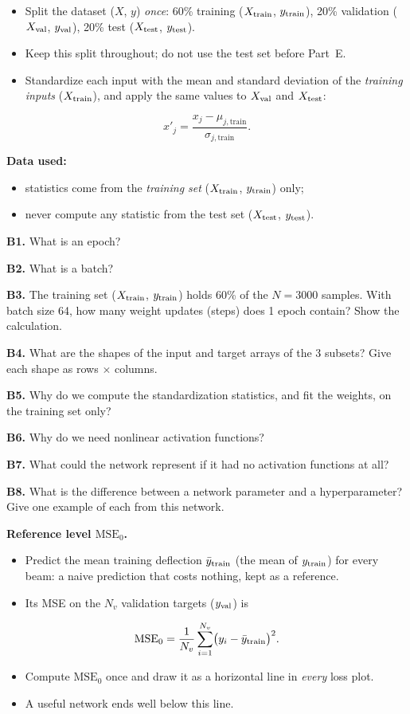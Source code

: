 \documentclass[11pt]{article}
\newcommand{\question}[2]{\par\noindent\textbf{#1.} #2\par}
\newcommand{\datause}[1]{\par\smallskip\needspace{4\baselineskip}\noindent\textbf{Data used:}\nopagebreak\begin{itemize}#1\end{itemize}}
\begin{document}
\begin{itemize}
  \item Split the dataset ($X$, $y$) \emph{once}: 60\% training ($X_{\rm train}$, $y_{\rm train}$), 20\% validation ($X_{\rm val}$, $y_{\rm val}$), 20\% test ($X_{\rm test}$, $y_{\rm test}$).
  \item Keep this split throughout; do not use the test set before Part~E.
  \item Standardize each input with the mean and standard deviation of the \emph{training inputs} ($X_{\rm train}$), and apply the same values to $X_{\rm val}$ and $X_{\rm test}$:
\end{itemize}
\[
  x'_j=\frac{x_j-\mu_{j,\mathrm{train}}}{\sigma_{j,\mathrm{train}}}.
\]
\datause{
  \item statistics come from the \emph{training set} ($X_{\rm train}$, $y_{\rm train}$) only;
  \item never compute any statistic from the test set ($X_{\rm test}$, $y_{\rm test}$).}
\begin{center}
\end{center}

\question{B1}{What is an epoch?}
\question{B2}{What is a batch?}
\question{B3}{The training set ($X_{\rm train}$, $y_{\rm train}$) holds 60\% of the $N=3000$ samples. With batch size 64, how many weight updates (steps) does 1 epoch contain? Show the calculation.}
\question{B4}{What are the shapes of the input and target arrays of the 3 subsets? Give each shape as rows $\times$ columns.}
\question{B5}{Why do we compute the standardization statistics, and fit the weights, on the training set only?}
\question{B6}{Why do we need nonlinear activation functions?}
\question{B7}{What could the network represent if it had no activation functions at all?}
\question{B8}{What is the difference between a network parameter and a hyperparameter? Give one example of each from this network.}

\noindent\textbf{Reference level $\mathrm{MSE}_0$.}
\begin{itemize}
  \item Predict the mean training deflection $\bar y_{\rm train}$ (the mean of $y_{\rm train}$) for every beam: a naive prediction that costs nothing, kept as a reference.
  \item Its MSE on the $N_v$ validation targets ($y_{\rm val}$) is
\end{itemize}
\[
  \mathrm{MSE}_0=\frac{1}{N_v}\sum_{i=1}^{N_v}\bigl(y_i-\bar y_{\rm train}\bigr)^2 .
\]
\begin{itemize}
  \item Compute $\mathrm{MSE}_0$ once and draw it as a horizontal line in \emph{every} loss plot.
  \item A useful network ends well below this line.
\end{itemize}
\end{document}
